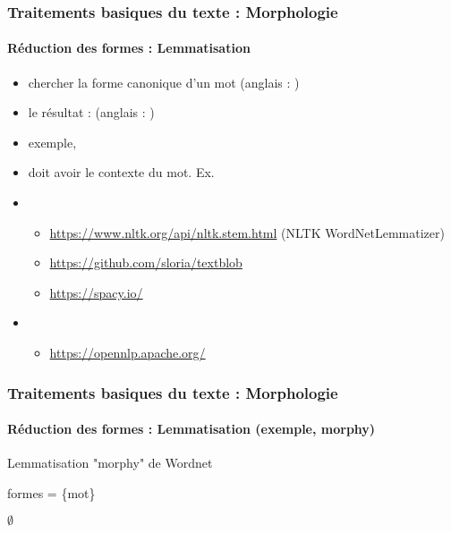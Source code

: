 \documentclass[xcolor=table]{beamer}
\begin{document}
\begin{frame}
\frametitle{Traitements basiques du texte : Morphologie}
\framesubtitle{Réduction des formes : Lemmatisation}

\begin{itemize}
	\item chercher la forme canonique d'un mot (anglais : )
	\item le résultat :  (anglais : )
	\item exemple, 
	\item doit avoir le contexte du mot. Ex. 
	\item {}
	\begin{itemize}
		\item \url{https://www.nltk.org/api/nltk.stem.html} (NLTK WordNetLemmatizer)
		\item \url{https://github.com/sloria/textblob}
		\item \url{https://spacy.io/}
	\end{itemize}
	\item {}
	\begin{itemize}
		\item \url{https://opennlp.apache.org/}
	\end{itemize}
\end{itemize}

\end{frame}

\begin{frame}[fragile]
\frametitle{Traitements basiques du texte : Morphologie}
\framesubtitle{Réduction des formes : Lemmatisation (exemple, morphy)}

\begin{block}{Lemmatisation "morphy" de Wordnet}
	\footnotesize
	\begin{algorithm}[H]
		
		
		formes = \{mot\}
		
		
		\Return $ \emptyset $\;

	\end{algorithm}
\end{block}

\end{frame}

\end{document}
